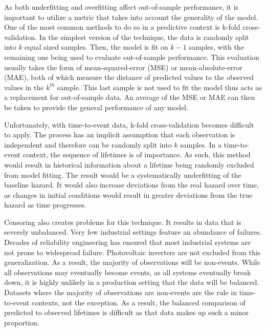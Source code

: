 As both underfitting and overfitting affect out-of-sample performance, it is important to utilize a metric that takes into account the generality of the model. One of the most common methods to do so in a predictive context is k-fold cross-validation. In the simplest version of the technique, the data is randomly split into $k$ equal sized samples. Then, the model is fit on $k-1$ samples, with the remaining one being used to evaluate out-of-sample performance. This evaluation usually takes the form of mean-squared-error (MSE) or mean-absolute-error (MAE), both of which measure the distance of predicted values to the observed values in the $k^{th}$ sample. This last sample is not used to fit the model thus acts as a replacement for out-of-sample data. An average of the MSE or MAE can then be taken to provide the general performance of any model. 

Unfortunately, with time-to-event data, k-fold cross-validation becomes difficult to apply. The process has an implicit assumption that each observation is independent and therefore can be randomly split into $k$ samples. In a time-to-event context, the sequence of lifetimes is of importance. As such, this method would result in historical information about a lifetime being randomly excluded from model fitting. The result would be a systematically underfitting of the baseline hazard. It would also increase deviations from the real hazard over time, as changes in initial conditions would result in greater deviations from the true hazard as time progresses.


Censoring also creates problems for this technique. It results in data that is severely unbalanced. Very few industrial settings feature an abundance of failures. Decades of reliability engineering has ensured that most industrial systems are not prone to widespread failure. Photovoltaic inverters are not excluded from this generalization\cite{Petrone2008}. As a result, the majority of observations will be non-events. While all observations may eventually become events, as all systems eventually break down, it is highly unlikely in a production setting that the data will be balanced. Datasets where the majority of observations are non-events are the rule in time-to-event contexts, not the exception. As a result, the balanced comparison of predicted to observed lifetimes is difficult as that data makes up such a minor proportion. 

